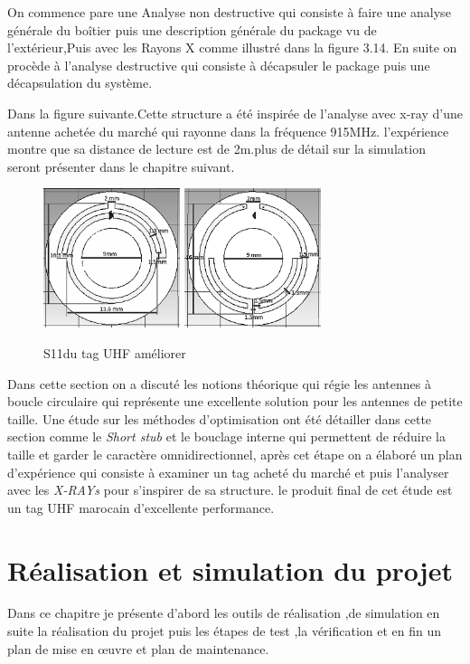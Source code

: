 \documentclass[11pt, a4paper, twoside]{book}
\begin{document}
On commence pare une Analyse non destructive qui consiste à faire une analyse générale  du boîtier puis une description générale du package vu de l’extérieur,Puis avec les Rayons X comme illustré dans la figure 3.14. En suite on procède à l'analyse destructive qui consiste à décapsuler le package puis une décapsulation du système.



Dans la figure suivante.Cette structure a été inspirée de l'analyse avec x-ray d'une antenne achetée du marché qui rayonne dans la fréquence 915MHz. l'expérience montre que sa distance de lecture est de 2m.plus de détail sur la simulation seront présenter dans le chapitre suivant.\\

\begin{figure}[H]
\centering
\includegraphics[width=4cm]{front11}
\includegraphics[width=4cm]{back22}
\caption{S11du tag UHF améliorer }
\end{figure}

Dans cette section on a discuté les notions théorique qui régie les antennes à boucle circulaire qui représente une excellente solution pour les antennes de petite taille. Une étude sur les méthodes d'optimisation ont été détailler dans cette section comme le \emph{Short stub} et le bouclage interne qui permettent de réduire la taille et garder le caractère omnidirectionnel, après cet étape on a élaboré un plan d'expérience qui consiste à examiner un tag acheté du marché et puis l'analyser avec les \emph{X-RAYs} pour s'inspirer de sa structure. le produit final de cet étude est un tag UHF marocain d'excellente performance.

\chapter{Réalisation et simulation du projet}
Dans ce chapitre je présente d'abord les outils de réalisation ,de	simulation en suite la réalisation	du projet puis les étapes de test ,la vérification et en fin un plan de mise en œuvre et plan de maintenance.
\end{document}
